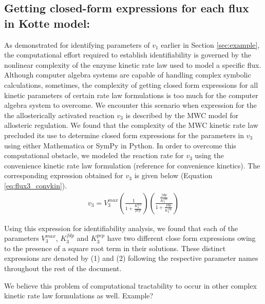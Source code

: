 \documentclass[10pt]{article}
\begin{document}
\subsection{Getting closed-form expressions for each flux in Kotte model:}\label{sec:closedform}
As demonstrated for identifying parameters of $v_1$ earlier in Section \ref{sec:example}, the computational effort required to establish identifiability is governed by the nonlinear complexity of the enzyme kinetic rate law used to model a specific flux. Although computer algebra systems are capable of handling complex symbolic calculations, sometimes, the complexity of getting closed form expressions for all kinetic parameters of certain rate law formulations is too much for the computer algebra system to overcome. We encounter this scenario when expression for the the allosterically activated reaction $v_3$ is described by the MWC model for allosteric regulation. We found that the complexity of the MWC kinetic rate law precluded its use to determine closed form expressions for the parameters in $v_3$ using either Mathematica or SymPy in Python. In order to overcome this computational obstacle, we modeled the reaction rate for $v_3$ using the convenience kinetic rate law formulation (reference for convenience kinetics). The corresponding expression obtained for $v_3$ is given below (Equation \ref{eq:flux3_convkin}). 
\begin{align}\label{eq:flux3_convkin}
	v_3 = V_3^{max}\left(\frac{1}{1 + \frac{K_3^{pep}}{pep}}\right)\left(\frac{\frac{fdp}{K_3^{fdp}}}{1 + \frac{fdp}{K_3^{fdp}}}\right)
\end{align}

Using this expression for identifiability analysis, we found that each of the parameters $V_3^{max}$, $K_3^{fdp}$ and $K_3^{pep}$ have two different close form expressions owing to the presence of a square root term in their solutions. These distinct expressions are denoted by (1) and (2) following the respective parameter names throughout the rest of the document. 

We believe this problem of computational tractability to occur in other complex kinetic rate law formulations as well. Example?
\end{document}
